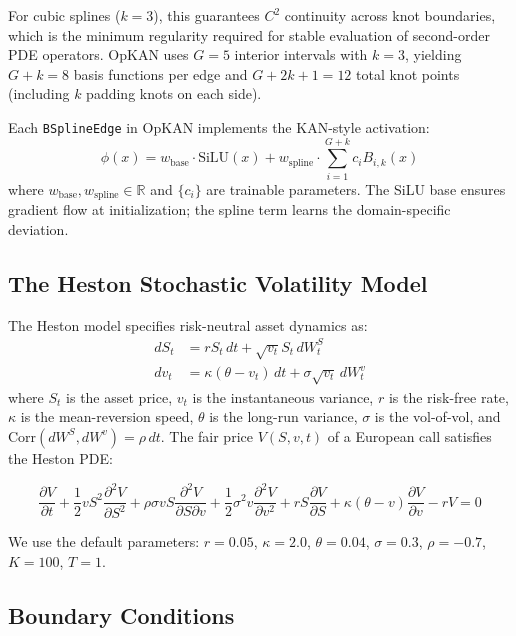\documentclass[11pt,a4paper]{article}
\begin{document}
For cubic splines ($k=3$), this guarantees $C^2$ continuity across knot boundaries, which is the minimum regularity required for stable evaluation of second-order PDE operators. OpKAN uses $G=5$ interior intervals with $k=3$, yielding $G + k = 8$ basis functions per edge and $G + 2k + 1 = 12$ total knot points (including $k$ padding knots on each side).

Each \texttt{BSplineEdge} in OpKAN implements the KAN-style activation:
\begin{equation}
\phi(x) = w_\text{base} \cdot \text{SiLU}(x) + w_\text{spline} \cdot \sum_{i=1}^{G+k} c_i B_{i,k}(x)
\label{eq:bspline_edge}
\end{equation}
where $w_\text{base}, w_\text{spline} \in \mathbb{R}$ and $\{c_i\}$ are trainable parameters. The SiLU base ensures gradient flow at initialization; the spline term learns the domain-specific deviation.

\subsection{The Heston Stochastic Volatility Model}

The Heston model \citep{heston1993closed} specifies risk-neutral asset dynamics as:
\begin{align}
dS_t &= r S_t \, dt + \sqrt{v_t} S_t \, dW_t^S \\
dv_t &= \kappa(\theta - v_t) \, dt + \sigma \sqrt{v_t} \, dW_t^v
\end{align}
where $S_t$ is the asset price, $v_t$ is the instantaneous variance, $r$ is the risk-free rate, $\kappa$ is the mean-reversion speed, $\theta$ is the long-run variance, $\sigma$ is the vol-of-vol, and $\text{Corr}(dW^S, dW^v) = \rho \, dt$. The fair price $V(S, v, t)$ of a European call satisfies the Heston PDE:

\begin{equation}
\frac{\partial V}{\partial t}
+ \frac{1}{2}vS^2\frac{\partial^2 V}{\partial S^2}
+ \rho\sigma vS\frac{\partial^2 V}{\partial S\partial v}
+ \frac{1}{2}\sigma^2 v\frac{\partial^2 V}{\partial v^2}
+ rS\frac{\partial V}{\partial S}
+ \kappa(\theta-v)\frac{\partial V}{\partial v}
- rV = 0
\label{eq:heston_pde}
\end{equation}

We use the default parameters: $r=0.05$, $\kappa=2.0$, $\theta=0.04$, $\sigma=0.3$, $\rho=-0.7$, $K=100$, $T=1$.

\subsection{Boundary Conditions}
\end{document}
